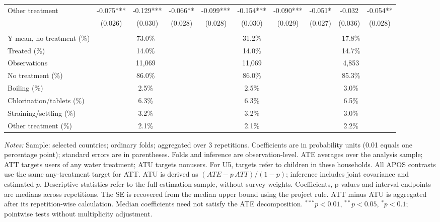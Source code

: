 \documentclass[10pt]{article}
\begin{document}
\begin{table}[H]
\begin{adjustbox}{max width=\linewidth}
\begin{tabular}{lccccccccc}
Other treatment & -0.075*** & -0.129*** & -0.066** & -0.099*** & -0.154*** & -0.090*** & -0.051* & -0.032 & -0.054** \\
 & (0.026) & (0.030) & (0.028) & (0.028) & (0.030) & (0.029) & (0.027) & (0.036) & (0.028) \\
\addlinespace[6pt]
\multicolumn{10}{l}{\textit{Descriptive statistics and sample}} \\
Y mean, no treatment (\%) & \multicolumn{3}{c}{73.0\%} & \multicolumn{3}{c}{31.2\%} & \multicolumn{3}{c}{17.8\%} \\
Treated (\%) & \multicolumn{3}{c}{14.0\%} & \multicolumn{3}{c}{14.0\%} & \multicolumn{3}{c}{14.7\%} \\
Observations & \multicolumn{3}{c}{11,069} & \multicolumn{3}{c}{11,069} & \multicolumn{3}{c}{4,853} \\
No treatment (\%) & \multicolumn{3}{c}{86.0\%} & \multicolumn{3}{c}{86.0\%} & \multicolumn{3}{c}{85.3\%} \\
Boiling (\%) & \multicolumn{3}{c}{2.5\%} & \multicolumn{3}{c}{2.5\%} & \multicolumn{3}{c}{3.0\%} \\
Chlorination/tablets (\%) & \multicolumn{3}{c}{6.3\%} & \multicolumn{3}{c}{6.3\%} & \multicolumn{3}{c}{6.5\%} \\
Straining/settling (\%) & \multicolumn{3}{c}{3.2\%} & \multicolumn{3}{c}{3.2\%} & \multicolumn{3}{c}{3.0\%} \\
Other treatment (\%) & \multicolumn{3}{c}{2.1\%} & \multicolumn{3}{c}{2.1\%} & \multicolumn{3}{c}{2.2\%} \\
\hline\hline
\end{tabular}
\end{adjustbox}
\par\vspace{3pt}
\begin{minipage}{\linewidth}\scriptsize \textit{Notes:} Sample: selected countries; ordinary folds; aggregated over 3 repetitions. Coefficients are in probability units (0.01 equals one percentage point); standard errors are in parentheses. Folds and inference are observation-level. ATE averages over the analysis sample; ATT targets users of any water treatment; ATU targets nonusers. For U5, targets refer to children in these households. All APOS contrasts use the same any-treatment target for ATT. ATU is derived as $(ATE-p\,ATT)/(1-p)$; inference includes joint covariance and estimated $p$. Descriptive statistics refer to the full estimation sample, without survey weights. Coefficients, p-values and interval endpoints are medians across repetitions. The SE is recovered from the median upper bound using the project rule. ATT minus ATU is aggregated after its repetition-wise calculation. Median coefficients need not satisfy the ATE decomposition. $^{***}p<0.01$, $^{**}p<0.05$, $^{*}p<0.1$; pointwise tests without multiplicity adjustment.\end{minipage}
\end{table}
\end{document}

